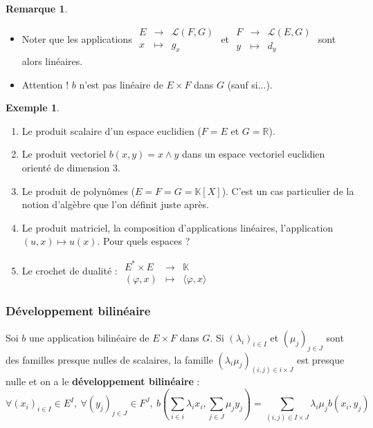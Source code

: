 \documentclass[french]{article}
\newcommand{\R}{\mathbb{R}}
\newcommand{\K}{\mathbb{K}}
\newcommand{\st}{^*}
\theoremstyle{plain}
\theoremstyle{definition}
\newtheorem*{ex}{Exemple}
\newtheorem*{rmq}{Remarque}
\theoremstyle{remark}
\begin{document}
\begin{rmq}
	\begin{itemize}
		\item Noter que les applications $\displaystyle\begin{array}{rcl}
			E&\longrightarrow&\mathcal{L}(F,G)\\
			x&\longmapsto&g_x
		\end{array}$ et $\displaystyle\begin{array}{rcl}
		F&\longrightarrow&\mathcal{L}(E,G)\\
		y&\longmapsto&d_y
		\end{array}$ sont alors linéaires.
		\item Attention ! $b$ n'est pas linéaire de $E\times F$ dans $G$ (sauf si...).
	\end{itemize}
\end{rmq}

\begin{ex}
	\begin{enumerate}
		\item Le produit scalaire d'un espace euclidien ($F=E$ et $G=\R$).
		\item Le produit vectoriel $b(x,y)=x\wedge y$ dans un espace vectoriel euclidien orienté de dimension $3$.
		\item Le produit de polynômes ($E=F=G=\K[X]$). C'est un cas particulier de la notion d'algèbre que l'on définit juste après.
		\item Le produit matriciel, la composition d'applications linéaires, l'application $(u,x)\mapsto u(x)$. Pour quels espaces ?
		\item Le crochet de dualité : $\displaystyle\begin{array}{rcl}
			E\st\times E&\longrightarrow&\K\\
			(\varphi,x)&\longmapsto&\langle\varphi,x\rangle
		\end{array}$
	\end{enumerate}
\end{ex}

\subsubsection*{Développement bilinéaire}

Soi $b$ une application bilinéaire de $E\times F$ dans $G$. Si $(\lambda_i)_{i\in I}$ et $(\mu_j)_{j\in J}$ sont des familles presque nulles de scalaires, la famille $(\lambda_i\mu_j)_{(i,j)\in i\times J}$ est presque nulle et on a le \textbf{développement bilinéaire} : $$\forall (x_i)_{i\in I}\in E^I,\ \forall (y_j)_{j\in J}\in F^J,\ b\left(\sum_{i\in i}\lambda_ix_i,\sum_{j\in J}\mu_j y_j\right)=\sum_{(i,j)\in I\times J}\lambda_i\mu_j b(x_i,y_j)$$
\end{document}
